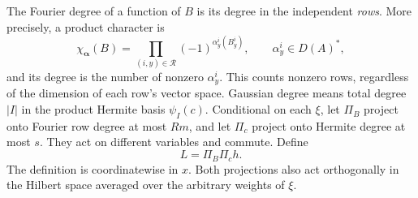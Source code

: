 The Fourier degree of a function of $B$ is its degree in the independent
\emph{rows}. More precisely, a product character is
\[
 \chi_{\boldsymbol\alpha}(B)
 =\prod_{(i,y)\in\mathcal R}(-1)^{\alpha^i_y(B^i_y)},
 \qquad \alpha^i_y\in D(A)^*,
\]
and its degree is the number of nonzero $\alpha^i_y$. This counts nonzero
rows, regardless of the dimension of each row's vector space. Gaussian
degree means total degree $|I|$ in the product Hermite basis $\psi_I(c)$.
Conditional on each $\xi$, let $\Pi_B$ project onto Fourier row degree at
most $Rm$, and let $\Pi_c$ project onto Hermite degree at most $s$.
They act on different variables and commute. Define
\begin{equation}\label{eq:low-degree-field}
 L=\Pi_B\Pi_c h.
\end{equation}
The definition is coordinatewise in $x$. Both projections also act
orthogonally in the Hilbert space averaged over the arbitrary weights
of $\xi$.

